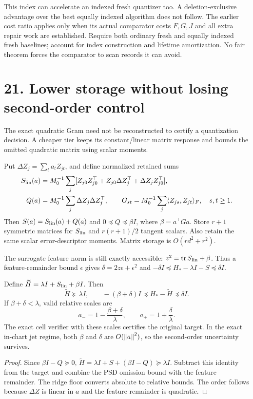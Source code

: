  This index can accelerate an indexed fresh quantizer too. A deletion-exclusive advantage over the best equally indexed algorithm does not follow. The earlier cost ratio applies only when its actual comparator costs $F,G,J$ and all extra repair work are established. Require both ordinary fresh and equally indexed fresh baselines; account for index construction and lifetime amortization. No fair theorem forces the comparator to scan records it can avoid.

\newpage
\section*{21. Lower storage without losing second-order control}
The exact quadratic Gram need not be reconstructed to certify a quantization decision. A cheaper tier keeps its constant/linear matrix response and bounds the omitted quadratic matrix using scalar moments.

Put $\Delta Z_j=\sum_t a_tZ_{jt}$, and define normalized retained sums
\begin{align*}
 S_{\rm lin}(a)&=M_0^{-1}\sum_j[Z_{j0}Z_{j0}^{\top}+Z_{j0}\Delta Z_j^{\top}+\Delta Z_jZ_{j0}^{\top}],\\
 Q(a)&=M_0^{-1}\sum_j\Delta Z_j\Delta Z_j^{\top},\qquad
 G_{st}=M_0^{-1}\sum_j\langle Z_{js},Z_{jt}\rangle_F,\quad s,t\geq1.
\end{align*}
Then $S(a)=S_{\rm lin}(a)+Q(a)$ and $0\preceq Q\preceq\beta I$, where $\beta=a^\top Ga$. Store $r+1$ symmetric matrices for $S_{\rm lin}$ and $r(r+1)/2$ tangent scalars. Also retain the same scalar error-descriptor moments. Matrix storage is $O(rd^2+r^2)$.

The surrogate feature norm is still exactly accessible:
$z^2=\operatorname{tr} S_{\rm lin}+\beta$. Thus a feature-remainder bound $\epsilon$ gives
$\delta=2z\epsilon+\epsilon^2$ and $-\delta I\preceq H_*-\lambda I-S\preceq\delta I$.

\begin{theorem}
Define $\widetilde H=\lambda I+S_{\rm lin}+\beta I$. Then
\[
 \widetilde H\succeq\lambda I,\qquad
 -(\beta+\delta)I\preceq H_*-\widetilde H\preceq\delta I.
\]
If $\beta+\delta<\lambda$, valid relative scales are
\[
 a_-=1-\frac{\beta+\delta}{\lambda},\qquad
 a_+=1+\frac{\delta}{\lambda}. \tag{24}
\]
The exact cell verifier with these scales certifies the original target. In the exact in-chart jet regime, both $\beta$ and $\delta$ are $O(\left\|a\right\|^2)$, so the second-order uncertainty survives.
\end{theorem}
\begin{proof}
Since $\beta I-Q\succeq0$, $\widetilde H=\lambda I+S+(\beta I-Q)\succeq\lambda I$. Subtract this identity from the target and combine the PSD omission bound with the feature remainder. The ridge floor converts absolute to relative bounds. The order follows because $\Delta Z$ is linear in $a$ and the feature remainder is quadratic.
\end{proof}


